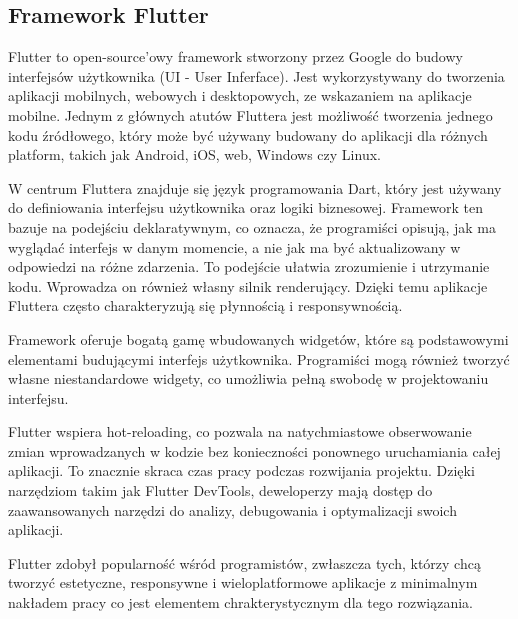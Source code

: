 \documentclass[12pt,twoside]{article}
\begin{document}
\subsection{Framework Flutter}
{Flutter to open-source'owy framework stworzony przez Google do budowy interfejsów użytkownika (UI - User Inferface). 
Jest wykorzystywany do tworzenia aplikacji mobilnych, webowych i desktopowych, ze wskazaniem na aplikacje mobilne. 
Jednym z głównych atutów Fluttera jest możliwość tworzenia jednego kodu źródłowego, który może być używany budowany do
 aplikacji dla różnych platform, takich jak Android, iOS, web, Windows czy Linux.

W centrum Fluttera znajduje się język programowania Dart, który jest używany do definiowania interfejsu użytkownika oraz logiki biznesowej. 
Framework ten bazuje na podejściu deklaratywnym, co oznacza, że programiści opisują, jak ma wyglądać interfejs w danym momencie,
 a nie jak ma być aktualizowany w odpowiedzi na różne zdarzenia. To podejście ułatwia zrozumienie i utrzymanie kodu.
Wprowadza on również własny silnik renderujący. Dzięki temu aplikacje Fluttera często charakteryzują się płynnością i responsywnością.

Framework oferuje bogatą gamę wbudowanych widgetów, które są podstawowymi elementami budującymi interfejs użytkownika. 
Programiści mogą również tworzyć własne niestandardowe widgety, co umożliwia pełną swobodę w projektowaniu interfejsu.

Flutter wspiera hot-reloading, co pozwala na natychmiastowe obserwowanie zmian wprowadzanych w kodzie bez konieczności ponownego uruchamiania całej aplikacji.
To znacznie skraca czas pracy podczas rozwijania projektu.
Dzięki narzędziom takim jak Flutter DevTools, deweloperzy mają dostęp do zaawansowanych narzędzi do analizy, debugowania i optymalizacji swoich aplikacji.

Flutter zdobył popularność wśród programistów, zwłaszcza tych, którzy chcą tworzyć estetyczne, responsywne i wieloplatformowe 
aplikacje z minimalnym nakładem pracy co jest elementem chrakterystycznym dla tego rozwiązania.}
\end{document}
